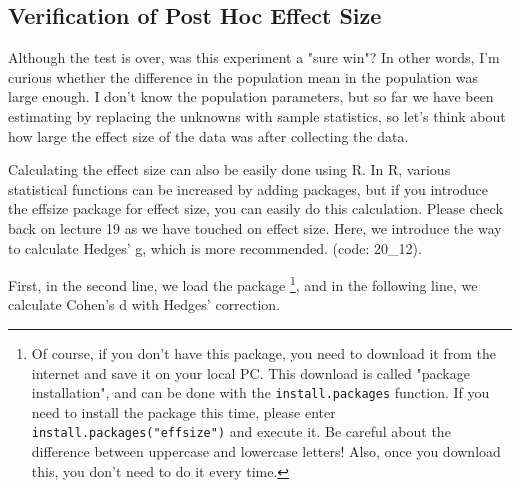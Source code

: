 \documentclass{ltjsbook}
\begin{document}
\subsection{Verification of Post Hoc Effect Size}
Although the test is over, was this experiment a "sure win"? In other words, I'm curious whether the difference in the population mean in the population was large enough. I don't know the population parameters, but so far we have been estimating by replacing the unknowns with sample statistics, so let's think about how large the effect size of the data was after collecting the data.

Calculating the effect size can also be easily done using R. In R, various statistical functions can be increased by adding packages, but if you introduce the effsize package for effect size, you can easily do this calculation. Please check back on lecture 19 as we have touched on effect size. Here, we introduce the way to calculate Hedges' g, which is more recommended. (code: 20_12).


First, in the second line, we load the package \footnote{Of course, if you don't have this package, you need to download it from the internet and save it on your local PC. This download is called "package installation", and can be done with the \texttt{install.packages} function. If you need to install the package this time, please enter \texttt{install.packages("effsize")} and execute it. Be careful about the difference between uppercase and lowercase letters! Also, once you download this, you don't need to do it every time.}, and in the following line, we calculate Cohen's d with Hedges' correction.
\end{document}
